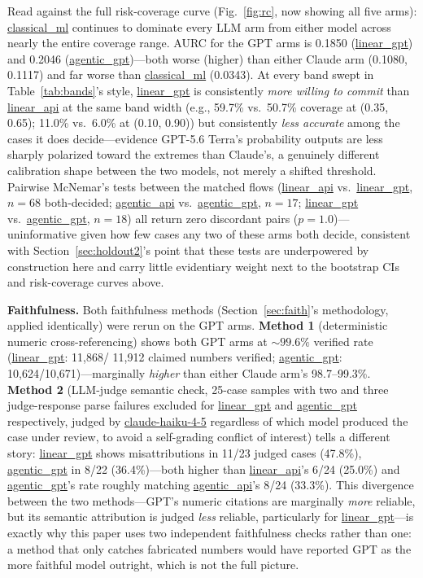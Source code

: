 \documentclass[]{ieeeaccess}
\newcommand{\code}[1]{\url{#1}}
\begin{document}
Read against the full risk-coverage curve (Fig.~\ref{fig:rc}, now showing all five
arms): \code{classical_ml} continues to dominate every LLM arm from
either model across nearly the entire coverage range. AURC for the GPT
arms is 0.1850 (\code{linear_gpt}) and 0.2046 (\code{agentic_gpt})---both worse (higher) than either Claude arm (0.1080, 0.1117) and far worse
than \code{classical_ml} (0.0343). At every band swept in Table~\ref{tab:bands}'s
style, \code{linear_gpt} is consistently \textit{more willing to commit}
than \code{linear_api} at the same band width (e.g., 59.7\% vs.\ 50.7\%
coverage at (0.35, 0.65); 11.0\% vs.\ 6.0\% at (0.10, 0.90)) but
consistently \textit{less accurate} among the cases it does decide---evidence GPT-5.6 Terra's probability outputs are less sharply polarized
toward the extremes than Claude's, a genuinely different calibration
shape between the two models, not merely a shifted threshold. Pairwise
McNemar's tests between the matched flows (\code{linear_api} vs.\
\code{linear_gpt}, $n=68$ both-decided; \code{agentic_api} vs.\
\code{agentic_gpt}, $n=17$; \code{linear_gpt} vs.\ \code{agentic_gpt},
$n=18$) all return zero discordant pairs ($p=1.0$)---uninformative given
how few cases any two of these arms both decide, consistent with Section~\ref{sec:holdout2}'s point that these tests are underpowered by construction here and
carry little evidentiary weight next to the bootstrap CIs and
risk-coverage curves above.

\textbf{Faithfulness.} Both faithfulness methods (Section~\ref{sec:faith}'s
methodology, applied identically) were rerun on the GPT arms.
\textbf{Method 1} (deterministic numeric cross-referencing) shows both
GPT arms at ${\sim}99.6\%$ verified rate (\code{linear_gpt}: 11{,}868/%
11{,}912 claimed numbers verified; \code{agentic_gpt}: 10{,}624/10{,}671)---marginally \textit{higher} than either Claude arm's 98.7--99.3\%.
\textbf{Method 2} (LLM-judge semantic check, 25-case samples with two and
three judge-response parse failures excluded for \code{linear_gpt} and
\code{agentic_gpt} respectively, judged by \code{claude-haiku-4-5} regardless of which model produced the case under
review, to avoid a self-grading conflict of interest) tells a different
story: \code{linear_gpt} shows misattributions in 11/23 judged cases
(47.8\%), \code{agentic_gpt} in 8/22 (36.4\%)---both higher than
\code{linear_api}'s 6/24 (25.0\%) and \code{agentic_gpt}'s rate roughly
matching \code{agentic_api}'s 8/24 (33.3\%). This divergence between the
two methods---GPT's numeric citations are marginally \textit{more}
reliable, but its semantic attribution is judged \textit{less} reliable,
particularly for \code{linear_gpt}---is exactly why this paper uses two
independent faithfulness checks rather than one: a method that only
catches fabricated numbers would have reported GPT as the more faithful
model outright, which is not the full picture.
\end{document}
